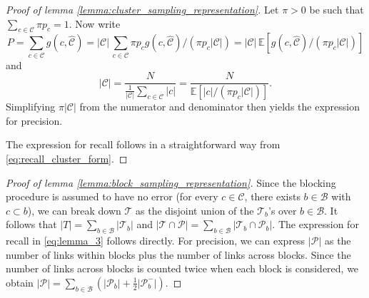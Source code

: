 \documentclass[fontsize=11pt]{article}
\theoremstyle{definition}
\begin{document}
\begin{proof}[Proof of lemma \ref{lemma:cluster_sampling_representation}]
Let $\pi > 0$ be such that $\sum_{c \in \mathcal{C}} \pi p_c= 1$. Now write
\begin{equation}
    P = \sum_{c \in \mathcal{C}} g(c, \widehat{\mathcal{C}}) = \lvert \mathcal{C} \rvert\, \sum _{c \in \mathcal{C}} \pi p_c g(c, \widehat{\mathcal{C}}) / (\pi p_c \lvert \mathcal{C} \rvert)  =  \lvert \mathcal{C}\rvert\, \mathbb{E}\left[ g(c, \widehat{\mathcal{C}})/(\pi p_c \lvert \mathcal{C} \rvert) \right]
\end{equation}
and 
\begin{equation}
    \lvert \mathcal{C} \rvert = \frac{N}{\frac{1}{\lvert \mathcal{C} \rvert} \sum_{c \in \mathcal{C}} \lvert c \rvert} = \frac{N}{\mathbb{E}[\lvert c \rvert / (\pi p_c \lvert \mathcal{C} \rvert)]}.
\end{equation}
Simplifying $\pi \lvert \mathcal{C} \rvert$ from the numerator and denominator then yields the expression for precision.

The expression for recall follows in a straightforward way from \eqref{eq:recall_cluster_form}.
\end{proof}

\begin{proof}[Proof of lemma \ref{lemma:block_sampling_representation}]
Since the blocking procedure is assumed to have no error (for every $ c \in \mathcal{C}$, there exists $b \in \mathcal{B}$ with $c \subset b$), we can break down $\mathcal{T}$ as the disjoint union of the $\mathcal{T}_b$'s over $b \in \mathcal{B}$. It follows that $\lvert T \rvert = \sum_{b \in \mathcal{B}} \lvert \mathcal{T}_b \rvert$ and  $\lvert \mathcal{T} \cap \mathcal{P} \rvert = \sum_{b \in \mathcal{B}} \lvert \mathcal{T}_b \cap \mathcal{P}_b \rvert$. The expression for recall in \eqref{eq:lemma_3} follows directly. For precision, we can express $\lvert \mathcal{P} \rvert$ as the number of links within blocks plus the number of links across blocks. Since the number of links across blocks is counted twice when each block is considered, we obtain $\lvert \mathcal{P} \rvert = \sum_{b \in \mathcal{B}} \left( \lvert \mathcal{P}_b \rvert + \tfrac{1}{2} \lvert \mathcal{P}_b^{-} \rvert \right)$. 
\end{proof}
\end{document}
